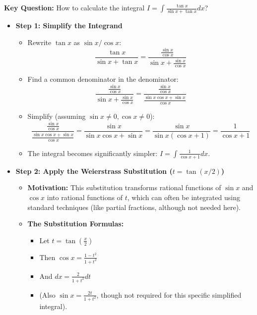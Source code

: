 \begin{cascade}
	\textbf{Key Question:} How to calculate the integral $I = \int \frac{\tan x}{\sin x + \tan x} dx$?
	\begin{itemize}
		\item \textbf{Step 1: Simplify the Integrand}
		      \begin{itemize}
			      \item Rewrite $\tan x$ as $\sin x / \cos x$:
			            \[ \frac{\tan x}{\sin x + \tan x} = \frac{\frac{\sin x}{\cos x}}{\sin x + \frac{\sin x}{\cos x}} \]
			      \item Find a common denominator in the denominator:
			            \[ \frac{\frac{\sin x}{\cos x}}{\sin x + \frac{\sin x}{\cos x}} = \frac{\frac{\sin x}{\cos x}}{\frac{\sin x \cos x + \sin x}{\cos x}} \]
			      \item Simplify (assuming $\sin x \neq 0, \cos x \neq 0$):
			            \[ \frac{\frac{\sin x}{\cos x}}{\frac{\sin x \cos x + \sin x}{\cos x}} = \frac{\sin x}{\sin x \cos x + \sin x} = \frac{\sin x}{\sin x (\cos x + 1)} = \frac{1}{\cos x + 1} \]
			      \item The integral becomes significantly simpler: $I = \int \frac{1}{\cos x + 1} dx$.
		      \end{itemize}
		\item \textbf{Step 2: Apply the Weierstrass Substitution ($t = \tan(x/2)$)}
		      \begin{itemize}
			      \item \textbf{Motivation:} This substitution transforms rational functions of $\sin x$ and $\cos x$ into rational functions of $t$, which can often be integrated using standard techniques (like partial fractions, although not needed here).
			      \item \textbf{The Substitution Formulas:}
			            \begin{itemize}
				            \item Let $\boxed{t = \tan\left(\frac{x}{2}\right)}$
				            \item Then $\cos x = \frac{1-t^2}{1+t^2}$
				            \item And $dx = \frac{2}{1+t^2} dt$
				            \item (Also $\sin x = \frac{2t}{1+t^2}$, though not required for this specific simplified integral).
			            \end{itemize}
		      \end{itemize}

\end{itemize}
\end{cascade}
